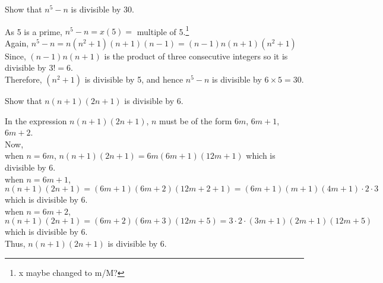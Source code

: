\documentclass[12pt,class=book,crop=false]{standalone}
\begin{document}
\begin{qn}[T-1]
    Show that $ n^5-n $ is divisible by 30.
\end{qn}
\begin{soln}
    As 5 is a prime, $ n^5-n=x(5)= $ multiple of 5.\footnote{x maybe changed to m/M?}\\
    Again, $ n^5-n=n(n^2+1)(n+1)(n-1)=(n-1)n(n+1)(n^2+1) $\\
    Since, $ (n-1)n(n+1) $ is the product of three consecutive integers so it is divisible by $ 3!=6 $.\\
    Therefore, $ (n^2+1) $ is divisible by 5, and hence $ n^5-n $ is divisible by $ 6\times 5=30 $.
\end{soln}
\begin{qn}[I]
    Show that $ n(n+1)(2n+1) $ is divisible by 6.
\end{qn}
\begin{soln}
    In the expression $ n(n+1)(2n+1) $, $ n $ must be of the form $ 6m $, $ 6m+1 $, $ 6m+2 $.\\
    Now,\\
    when $ n=6m $, $ n(n+1)(2n+1)= 6m(6m+1)(12m+1) $ which is divisible by 6.\\
    when $ n=6m+1 $, $ n(n+1)(2n+1)= (6m+1)(6m+2)(12m+2+1)=(6m+1)(m+1)(4m+1)\cdot2\cdot3 $ which is divisible by 6.\\
    when $ n=6m+2 $, $ n(n+1)(2n+1)= (6m+2)(6m+3)(12m+5)=3\cdot2\cdot(3m+1)(2m+1)(12m+5)$ which is divisible by 6.\\

    Thus, $ n(n+1)(2n+1) $ is divisible by 6.
\end{soln}
\end{document}
